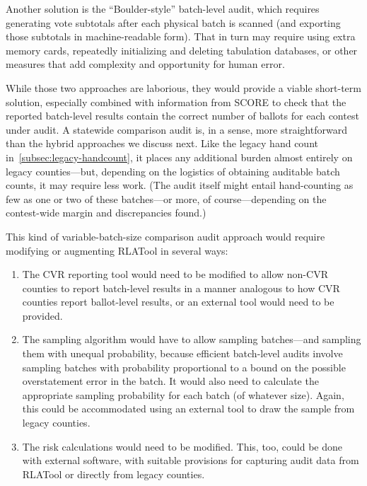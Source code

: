 \documentclass[12pt]{article}
\begin{document}
Another solution is the ``Boulder-style'' batch-level audit, which requires generating 
vote subtotals after each physical batch is scanned (and exporting those subtotals in machine-readable form).
That in turn may require using extra memory cards, repeatedly initializing and deleting tabulation databases,
or other measures that add complexity and opportunity for human error.

While those two approaches are laborious, they would provide a viable short-term solution,
especially combined with information from SCORE to check that the reported batch-level results 
contain the correct number of ballots for each contest under audit. 
A statewide comparison audit is, in a sense, more straightforward than the hybrid approaches we
discuss next. Like the legacy hand count in~\ref{subsec:legacy-handcount}, it places any additional
burden almost entirely on legacy counties---but, depending on the logistics of obtaining auditable
batch counts, it may require less work. (The audit itself might entail hand-counting as few as one or two of
these batches---or more, of course---depending on the contest-wide margin and discrepancies found.) 

This kind of variable-batch-size comparison audit approach would require modifying or augmenting
RLATool in several ways: 

\begin{enumerate}
  \item The CVR reporting tool would need to be modified to allow non-CVR counties to
report batch-level results in a manner analogous to how CVR counties report
ballot-level results, or an external tool would need to be provided.

  \item The sampling
algorithm would have to allow sampling batches---and sampling them with unequal probability,
because efficient batch-level audits involve sampling batches with probability proportional
to a bound on the possible overstatement error in the batch.
It would also need to calculate the appropriate sampling probability for each batch (of whatever size).
Again, this could be accommodated using an external tool to draw the sample from legacy counties.

  \item The risk calculations would need to be modified. 
This, too, could be done with external software, with suitable provisions for capturing audit data
from RLATool or directly from legacy counties.
\end{enumerate}
\end{document}
